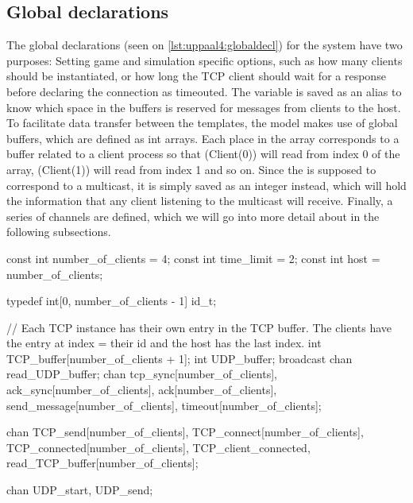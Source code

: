 \subsection{Global declarations}
The global declarations (seen on \autoref{lst:uppaal4:globaldecl}) for the system have two purposes: Setting game and simulation specific options, such as how many clients should be instantiated, or how long the TCP client should wait for a response before declaring the connection as timeouted.
The  variable is saved as an alias to know which space in the buffers is reserved for messages from clients to the host.
To facilitate data transfer between the templates, the model makes use of global buffers, which are defined as int arrays.
Each place in the array corresponds to a buffer related to a client process so that \uppProc(Client(0)) will read from index 0 of the array, \uppProc(Client(1)) will read from index 1 and so on.
Since the  is supposed to correspond to a multicast, it is simply saved as an integer instead, which will hold the information that any client listening to the multicast will receive. 
Finally, a series of channels are defined, which we will go into more detail about in the following subsections.

\begin{uppaalcode}[caption={Global declarations}, label={lst:uppaal4:globaldecl},captionpos=b]
const int number_of_clients = 4;
const int time_limit = 2;
const int host = number_of_clients;

typedef int[0, number_of_clients - 1] id_t;

// Each TCP instance has their own entry in the TCP buffer. The clients have the entry at index = their id and the host has the last index.
int TCP_buffer[number_of_clients + 1];
int UDP_buffer;
broadcast chan read_UDP_buffer;
chan tcp_sync[number_of_clients], ack_sync[number_of_clients], ack[number_of_clients], send_message[number_of_clients], timeout[number_of_clients];

chan TCP_send[number_of_clients], TCP_connect[number_of_clients], TCP_connected[number_of_clients], TCP_client_connected, read_TCP_buffer[number_of_clients];

chan UDP_start, UDP_send;
\end{uppaalcode}

